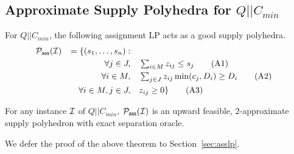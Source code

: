 \subsection{Approximate Supply Polyhedra for $Q||C_{min}$}
\def\pv{\mathbf{b}}
%
%
\noindent
For $Q||C_{min}$, the following assignment LP acts as a good supply polyhedra.
\begin{alignat}{4}
	{\cal P}_\mathsf{ass}({\cal I})  && = \{(s_1,\ldots,s_n):  && \notag \\
	&& \quad \forall j \in J,   &\quad  \textstyle \sum_{i\in M} z_{ij}  \leq  s_j \label{eq:asslp1} \tag{A1} \\
	&& \quad \forall i\in M ,  &\quad  \textstyle \sum_{j\in J}  z_{ij}  \min(c_j,D_i) \geq D_i \label{eq:asslp2} \tag{A2}\\
	&& \quad \forall i\in M, j\in J, & \quad z_{ij}   \geq 0 \label{eq:asslp3}  \} \tag{A3}
\end{alignat}
\begin{theorem}\label{thm:asslp}
	For any instance ${\cal I}$ of $Q||C_{min}$, ${\cal P}_\mathsf{ass}({\cal I})$ is an upward feasible, $2$-approximate supply polyhedron with exact separation oracle.
\end{theorem}
\noindent
We defer the proof of the above theorem to Section~\ref{sec:asslp}.

